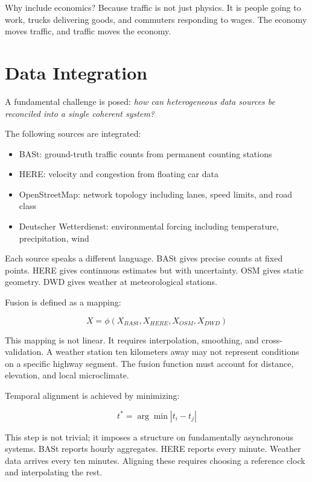 \documentclass[12pt]{article}
\begin{document}
Why include economics? Because traffic is not just physics. It is people going to work, trucks delivering goods, and commuters responding to wages. The economy moves traffic, and traffic moves the economy.

\section{Data Integration}

A fundamental challenge is posed: \textit{how can heterogeneous data sources be reconciled into a single coherent system?}

The following sources are integrated:

\begin{itemize}
\item BASt: ground-truth traffic counts from permanent counting stations
\item HERE: velocity and congestion from floating car data
\item OpenStreetMap: network topology including lanes, speed limits, and road class
\item Deutscher Wetterdienst: environmental forcing including temperature, precipitation, wind
\end{itemize}

Each source speaks a different language. BASt gives precise counts at fixed points. HERE gives continuous estimates but with uncertainty. OSM gives static geometry. DWD gives weather at meteorological stations.

Fusion is defined as a mapping:

\begin{equation}
X = \phi(X_{BASt}, X_{HERE}, X_{OSM}, X_{DWD})
\end{equation}

This mapping is not linear. It requires interpolation, smoothing, and cross-validation. A weather station ten kilometers away may not represent conditions on a specific highway segment. The fusion function must account for distance, elevation, and local microclimate.

Temporal alignment is achieved by minimizing:

\begin{equation}
t^* = \arg\min |t_i - t_j|
\end{equation}

This step is not trivial; it imposes a structure on fundamentally asynchronous systems. BASt reports hourly aggregates. HERE reports every minute. Weather data arrives every ten minutes. Aligning these requires choosing a reference clock and interpolating the rest.
\end{document}
